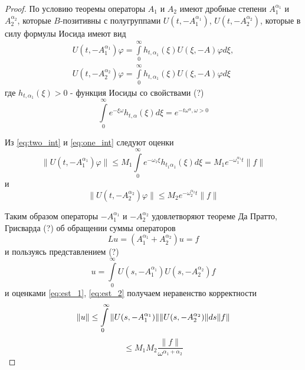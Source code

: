 \documentclass{article}
\begin{document}
\begin{proof}
    По условию теоремы операторы $A_1$ и $A_2$ имеют дробные степени $A_1^{\alpha_1}$ и $A_2^{\alpha_2}$,
    которые $B$-позитивны с полугруппами $U(t, -A_1^{\alpha_1})$, $U(t, -A_2^{\alpha_2})$,
    которые в силу формулы Иосида имеют вид
    \begin{equation}
        \label{eq:two_int}
        \begin{aligned}
            U(t, -A_1^{\alpha_1})\varphi = \int\limits_0^\infty h_{t, \alpha_1}(\xi) U(\xi, -A) \varphi d\xi,\\
            U(t, -A_2^{\alpha_2})\varphi = \int\limits_0^\infty h_{t, \alpha_1}(\xi) U(\xi, -A) \varphi d\xi
        \end{aligned}
    \end{equation}
    где $h_{t, \alpha_1}(\xi) > 0$ - функция Иосиды со свойствами (?)
    \begin{equation}
        \label{eq:one_int}
        \int\limits_0^\infty e^{-\xi \omega} h_{t, \alpha}(\xi) d\xi = e^{-t\omega^{\alpha}, \omega > 0}
    \end{equation}

    Из \eqref{eq:two_int} и \eqref{eq:one_int} следуют оценки
    \begin{equation}
        \label{eq:est_1}
        \|U(t, -A_1^{\alpha_1})\varphi\| \le M_1 \int\limits_0^\infty e^{-\omega_1\xi}h_{t_1\alpha_1}(\xi) d\xi
        = M_1 e^{-\omega_1^{\alpha_1}t}\|f\|
    \end{equation}
    и
    \begin{equation}
        \label{eq:est_2}
        \|U(t, -A_2^{\alpha_2})\varphi\| \le M_2 e^{-\omega_2^{\alpha_2}t}\|f\|
    \end{equation}

    Таким образом операторы $-A_1^{\alpha_1}$ и $-A_2^{\alpha_2}$ удовлетворяют теореме Да Пратто, Грисварда (?)
    об обращении суммы операторов
    \begin{equation}
        Lu = (A_1^{\alpha_1} + A_2^{\alpha_2})u = f
    \end{equation}
    и пользуясь представлением (?)
    \begin{equation}
        u = \int\limits_0^\infty U(s, -A_1^{\alpha_1}) U(s, -A_2^{\alpha_2})f
    \end{equation}
    и оценками \eqref{eq:est_1}, \eqref{eq:est_2} получаем неравенство корректности
    \begin{equation*}
        \|u\| \le \int\limits_0^\infty \|U(s, -A_1^{\alpha_1})\| \|U(s, -A_2^{\alpha_2})\| ds \|f\|\\
    \end{equation*}
    \begin{equation}
        \le M_1 M_2 \frac{\|f\|}{\omega^{\alpha_1 + \alpha_2}}
    \end{equation}
\end{proof}
\end{document}
